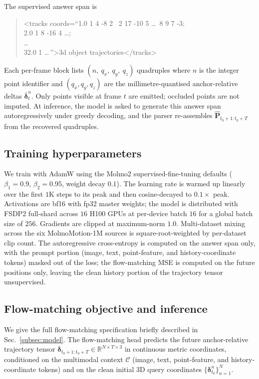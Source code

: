 The supervised answer span is

\begin{quote}\small\ttfamily
<tracks coords=``1.0 1 4 -8 2 \ 2 17 -10 5 \ldots\ 8 9 7 -3;\\
\hphantom{<tracks coords=``}2.0 1 8 -16 4 \ldots;\\
\hphantom{<tracks coords=``}\ldots\\
\hphantom{<tracks coords=``}32.0 1 \ldots\,''>3d object trajectories</tracks>
\end{quote}

Each per-frame block lists $(n,\ q_x,\ q_y,\ q_z)$ quadruples where $n$ is the
integer point identifier and $(q_x,q_y,q_z)$ are the millimetre-quantised
anchor-relative deltas $\bar{\boldsymbol{\delta}}_{t}^{n}$. Only points visible at frame $t$
are emitted; occluded points are not imputed. At inference, the model is asked
to generate this answer span autoregressively under greedy decoding, and the
parser re-assembles $\hat{\mathbf{P}}_{t_0+1:t_0+T}$ from the recovered
quadruples.

\subsection{Training hyperparameters}
\label{appsec:training}

We train with AdamW using the Molmo2 supervised-fine-tuning defaults
($\beta_1=0.9$, $\beta_2=0.95$, weight decay $0.1$). The learning rate is
warmed up linearly over the first $1$K steps to its peak and then cosine-decayed
to $0.1\times$ peak. Activations are bf16 with fp32 master weights; the model is
distributed with FSDP2 full-shard across $16$ H100 GPUs at per-device batch $16$
for a global batch size of $256$. Gradients are clipped at maximum-norm $1.0$.
Multi-dataset mixing across the six MolmoMotion-1M sources is square-root-weighted
by per-dataset clip count. The autoregressive cross-entropy is computed on the
answer span only, with the prompt portion (image, text, point-feature, and
history-coordinate tokens) masked out of the loss; the flow-matching MSE is
computed on the future positions only, leaving the clean history portion of
the trajectory tensor unsupervised.

\subsection{Flow-matching objective and inference}
\label{appsec:flowmatching}

We give the full flow-matching specification briefly described in
Sec.~\ref{subsec:model}. The flow-matching head predicts the future
anchor-relative trajectory tensor
$\boldsymbol{\delta}_{t_0+1:t_0+T} \in \mathbb{R}^{N \times T \times 3}$
in continuous metric coordinates, conditioned on the multimodal context
$\mathcal{C}$ (image, text, point-feature, and history-coordinate tokens) and
on the clean initial 3D query coordinates
$\{\boldsymbol{\delta}_{t_0}^{n}\}_{n=1}^{N}$.

